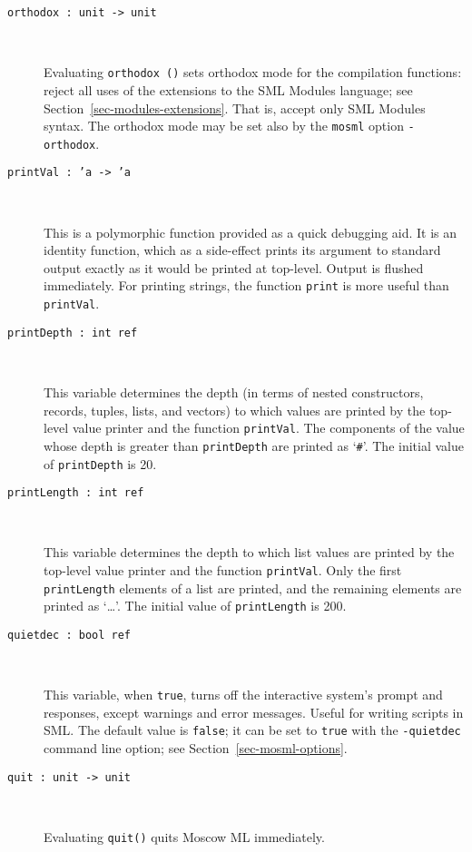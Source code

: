 \documentclass[fleqn,a4paper]{article}
\begin{document}
\begin{description}
\item[{\tt orthodox :\ unit -> unit}]\mbox{ }
  
  Evaluating \texttt{orthodox ()} sets orthodox mode for the
  compilation functions: reject all uses of the extensions to the SML
  Modules language; see Section~\ref{sec-modules-extensions}.  That
  is, accept only SML Modules syntax.  The orthodox mode may be set
  also by the \texttt{mosml} option \texttt{-orthodox}.

\item[{\tt printVal :\ 'a -> 'a}]\mbox{ }
  
  This is a polymorphic function provided as a quick debugging aid.
  It is an identity function, which as a side-effect prints its
  argument to standard output exactly as it would be printed at
  top-level.  Output is flushed immediately.  For printing strings,
  the function {\tt print} is more useful than {\tt printVal}.

\item[{\tt printDepth :\ int ref}]\mbox{ }

  This variable determines the depth (in terms of nested constructors,
  records, tuples, lists, and vectors) to which values are printed by
  the top-level value printer and the function {\tt printVal}. The
  components of the value whose depth is greater than {\tt printDepth}
  are printed as `{\tt \#}'.  The initial value of {\tt printDepth} is
  20. 

\item[{\tt printLength :\ int ref}]\mbox{ }
  
  This variable determines the depth to which list values are printed
  by the top-level value printer and the function {\tt printVal}.
  Only the first {\tt printLength} elements of a list are printed, and
  the remaining elements are printed as `\ldots'.  The initial value
  of {\tt printLength} is 200.

\item[{\tt quietdec :\ bool ref}]\mbox{ }

  This variable, when {\tt true}, turns off the interactive system's
  prompt and responses, except warnings and error messages.  Useful
  for writing scripts in SML\@.  The default value is {\tt false}; it
  can be set to {\tt true} with the {\tt -quietdec} command line
  option; see Section~\ref{sec-mosml-options}.

\item[{\tt quit :\ unit -> unit}]\mbox{ }

  Evaluating {\tt quit()} quits Moscow ML immediately.


\end{description}
\end{document}
